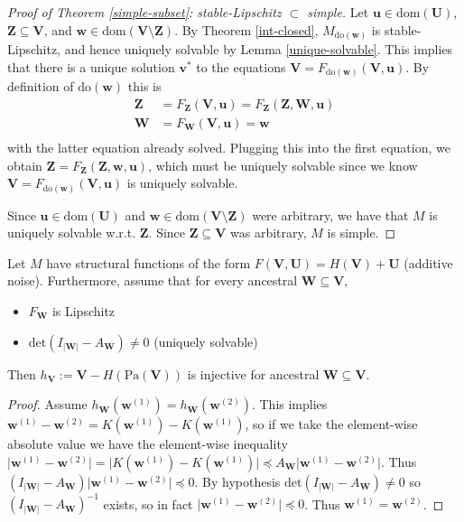 \documentclass[12pt]{article}
\begin{document}
\begin{proof}[Proof of Theorem \ref{simple-subset}: stable-Lipschitz $\subset$ simple]
Let $\mathbf{u}\in\text{dom}(\mathbf{U})$, $\mathbf{Z}\subseteq\mathbf{V}$, and $\mathbf{w}\in\text{dom}(\mathbf{V}\setminus\mathbf{Z})$.
By Theorem \ref{int-closed}, $M_{\text{do}(\mathbf{w})}$ is stable-Lipschitz, and hence uniquely solvable by Lemma \ref{unique-solvable}.
This implies that there is a unique solution $\mathbf{v}^*$ to the equations $\mathbf{V}=F_{\text{do}(\mathbf{w})}(\mathbf{V},\mathbf{u})$.
By definition of $\text{do}(\mathbf{w})$ this is
\begin{align*}
\mathbf{Z} &= F_{\mathbf{Z}}(\mathbf{V},\mathbf{u}) = F_{\mathbf{Z}}(\mathbf{Z},\mathbf{W},\mathbf{u}) \\
\mathbf{W} &= F_{\mathbf{W}}(\mathbf{V},\mathbf{u}) = \mathbf{w} \\
\end{align*}
with the latter equation already solved.
Plugging this into the first equation, we obtain $\mathbf{Z} = F_{\mathbf{Z}}(\mathbf{Z},\mathbf{w},\mathbf{u})$, which must be uniquely solvable since we know $\mathbf{V}=F_{\text{do}(\mathbf{w})}(\mathbf{V},\mathbf{u})$ is uniquely solvable.

Since $\mathbf{u}\in\text{dom}(\mathbf{U})$ and $\mathbf{w}\in\text{dom}(\mathbf{V}\setminus\mathbf{Z})$ were arbitrary, we have that $M$ is uniquely solvable w.r.t. $\mathbf{Z}$.
Since $\mathbf{Z}\subseteq\mathbf{V}$ was arbitrary, $M$ is simple.
\end{proof}

\begin{lemma}[Injectivity] \label{injective}
Let $M$ have structural functions of the form $F(\mathbf{V},\mathbf{U})=H(\mathbf{V})+\mathbf{U}$ (additive noise). Furthermore, assume that for every ancestral $\mathbf{W}\subseteq \mathbf{V}$, 
\begin{itemize}
  \item $F_{\mathbf{W}}$ is Lipschitz
  \item $\text{det}(I_{|\mathbf{W}|}-A_\mathbf{W})\neq 0$ (uniquely solvable)
\end{itemize}
Then $h_\mathbf{V}:=\mathbf{V}-H(\text{Pa}(\mathbf{V}))$ is injective for ancestral $\mathbf{W}\subseteq\mathbf{V}$.
\end{lemma}

\begin{proof}
Assume $h_\mathbf{W}(\mathbf{w}^{(1)})=h_\mathbf{W}(\mathbf{w}^{(2)})$. This implies $\mathbf{w}^{(1)}-\mathbf{w}^{(2)} = K(\mathbf{w}^{(1)}) - K(\mathbf{w}^{(1)})$, so if we take the element-wise absolute value we have the element-wise inequality $\lvert\mathbf{w}^{(1)}-\mathbf{w}^{(2)}\rvert = \lvert K(\mathbf{w}^{(1)}) - K(\mathbf{w}^{(1)})\rvert\preceq A_\mathbf{W} \lvert\mathbf{w}^{(1)}-\mathbf{w}^{(2)}\rvert$. Thus $(I_{|\mathbf{W}|}-A_\mathbf{W})\lvert\mathbf{w}^{(1)}-\mathbf{w}^{(2)}\rvert\preceq 0$. By hypothesis $\text{det}(I_{|\mathbf{W}|}-A_\mathbf{W})\neq 0$ so $(I_{|\mathbf{W}|}-A_\mathbf{W})^{-1}$ exists, so in fact $\lvert\mathbf{w}^{(1)}-\mathbf{w}^{(2)}\rvert\preceq 0$. Thus $\mathbf{w}^{(1)}=\mathbf{w}^{(2)}$.
\end{proof}
\end{document}
